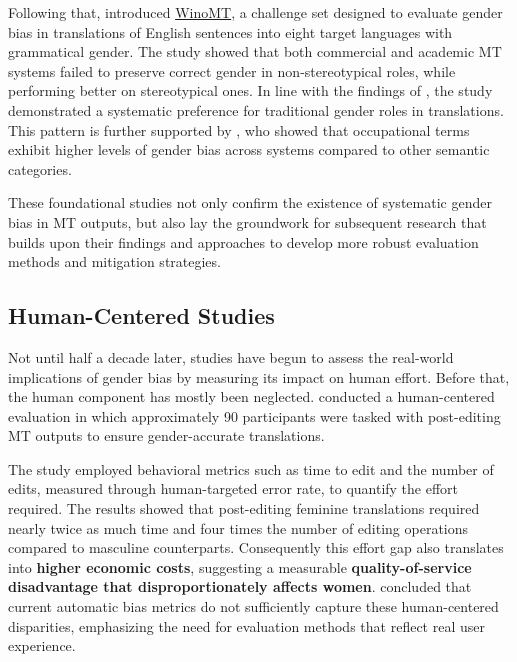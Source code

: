Following that, \textbf{\citet{stanovskyEvaluatingGenderBias2019}} introduced \href{https://github.com/gabrielStanovsky/mt_gender}{WinoMT}, a challenge set designed to evaluate gender bias in translations of English sentences into eight target languages with grammatical gender. The study showed that both commercial and academic MT systems failed to preserve correct gender in non-stereotypical roles, while performing better on stereotypical ones. In line with the findings of \citeauthor{pratesAssessingGenderBias2019}, the study demonstrated a systematic preference for traditional gender roles in translations. This pattern is further supported by \textbf{\citet{choMeasuringGenderBias2019}}, who showed that occupational terms exhibit higher levels of gender bias across systems compared to other semantic categories. 

These foundational studies not only confirm the existence of systematic gender bias in MT outputs, but also lay the groundwork for subsequent research that builds upon their findings and approaches to develop more robust evaluation methods and mitigation strategies.

\subsection{Human-Centered Studies}
Not until half a decade later, studies have begun to assess the real-world implications of gender bias by measuring its impact on human effort. Before that, the human component has mostly been neglected. \citet{savoldiWhatHarmQuantifying2024} conducted a human-centered evaluation in which approximately 90 participants were tasked with post-editing MT outputs to ensure gender-accurate translations.

The study employed behavioral metrics such as time to edit and the number of edits, measured through human-targeted error rate, to quantify the effort required. The results showed that post-editing feminine translations required nearly twice as much time and four times the number of editing operations compared to masculine counterparts. Consequently this effort gap also translates into \textbf{higher economic costs}, suggesting a measurable \textbf{quality-of-service disadvantage that disproportionately affects women}. \citeauthor{savoldiWhatHarmQuantifying2024} concluded that current automatic bias metrics do not sufficiently capture these human-centered disparities, emphasizing the need for evaluation methods that reflect real user experience.

